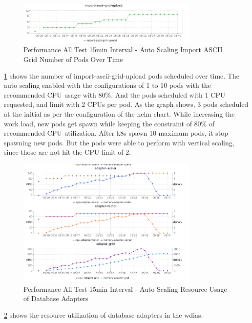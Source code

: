 \begin{figure}[htp]
    \centering
    \includegraphics[width=0.8\textwidth]{results/obs/all_auto/obs_all_auto_15m_import_grid_pod.png}
    \caption{Performance All Test 15min Interval - Auto Scaling Import ASCII Grid Number of Pods Over Time }
    \label{fi:obs_all_auto_15m_import_grid_pod}
\end{figure}
\ref{fi:obs_all_auto_15m_import_grid_pod} shows the number of import-ascii-grid-upload pods scheduled over time. The auto scaling enabled with the configurations of 1 to 10 pods with the recommended CPU usage with 80\%. And the pods scheduled with 1 CPU requested, and limit with 2 CPUs per pod.
As the graph shows, 3 pods scheduled at the initial as per the configuration of the helm chart. While increasing the work load, new pods get spawn while keeping the constraint of 80\% of recommended CPU utilization. After \acrshort{k8s} spawn 10 maximum pods, it stop spawning new pods. But the pods were able to perform with vertical scaling, since those are not hit the CPU limit of 2.

\begin{figure}[htp]
    \centering
    \includegraphics[width=0.8\textwidth]{results/obs/all_auto/obs_all_auto_15m_adapter_dbs_res.png}
    \caption{Performance All Test 15min Interval - Auto Scaling Resource Usage of Database Adapters }
    \label{fi:obs_all_auto_15m_adapter_dbs_res}
\end{figure}
\ref{fi:obs_all_auto_15m_adapter_dbs_res} shows the resource utilization of database adapters in the \acrshort{wdias}.


